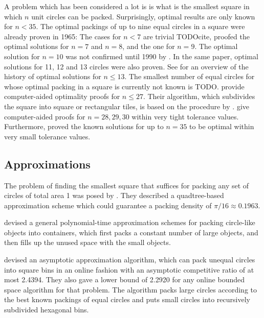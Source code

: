 \documentclass[a4paper,style=print,bibliography=totoc,nexus,lnum,extramargin]{tubsbook}
\begin{document}
A problem which has been considered a lot is is what is the smallest square in which $n$ unit circles can be packed. Surprisingly, optimal results are only known for $n < 35$.
The optimal packings of up to nine equal circles in a square were already proven in 1965: The cases for $n < 7$ are trivial TODOcite,
\textcite{schaer1965densest} proofed the optimal solutions for $n = 7$ and $n = 8$, and \textcite{SM1965geometric} the one for $n = 9$.
The optimal solution for $n = 10$ was not confirmed until 1990 by \textcite{DPW1990optimal}. In the same paper, optimal solutions for 11, 12 and 13 circles were also proven.
See \textcite{WMP1994history} for an overview of the history of optimal solutions for $n \le 13$.
The smallest number of equal circles for whose optimal packing in a square is currently not known is TODO.
\textcite{NO1998more} provide computer-aided optimality proofs for $n \le 27$. Their algorithm, which subdivides the square into square or rectangular tiles, is based on the procedure by \textcite{PWMD1992packing}.
\textcite{MC2005new} give computer-aided proofs for $n=28,29,30$ within very tight tolerance values.
Furthermore, \textcite{LR2002packing} proved the known solutions for up to $n=35$ to be optimal within very small tolerance values.

\subsection{Approximations}

The problem of finding the smallest square that suffices for packing any set of circles of total area 1 was posed by \textcite{DFL2010circle}. They described a quadtree-based approximation scheme which could guarantee a packing density of $\pi/16 \approx 0.1963$.

\textcite{MPSSW2014polynomial} devised a general polynomial-time approximation schemes for packing circle-like objects into containers, which first packs a constant number of large objects, and then fills up the unused space with the small objects.

\textcite{HMS2016bounded} devised an asymptotic approximation algorithm, which can pack unequal circles into square bins in an online fashion with an asymptotic competitive ratio of at most 2.4394. They also gave a lower bound of 2.2920 for any online bounded space algorithm for that problem. The algorithm packs large circles according to the best known packings of equal circles and puts small circles into recursively subdivided hexagonal bins.
\end{document}
